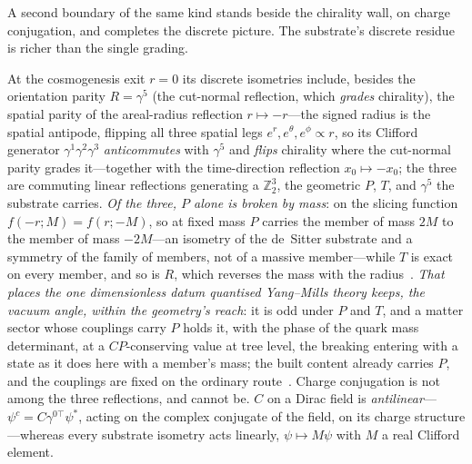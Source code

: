 \documentclass[11pt]{article}
\theoremstyle{plain}
\theoremstyle{remark}
\begin{document}
A second boundary of the same kind stands beside the chirality wall, on charge conjugation, and completes the discrete picture. The substrate's discrete residue is richer than the single grading. 

At the cosmogenesis exit $r=0$ its discrete isometries include, besides the orientation parity $R=\gamma^5$ (the cut-normal reflection, which \emph{grades} chirality), the spatial parity of the areal-radius reflection $r\mapsto-r$---the signed radius is the spatial antipode, flipping all three spatial legs $e^r,e^\theta,e^\phi\propto r$, so its Clifford generator $\gamma^1\gamma^2\gamma^3$ \emph{anticommutes} with $\gamma^5$ and \emph{flips} chirality where the cut-normal parity grades it---together with the time-direction reflection $x_0\mapsto-x_0$; the three are commuting linear reflections generating a $\mathbb{Z}_2^{3}$, the geometric $P$, $T$, and $\gamma^5$ the substrate carries. \emph{Of the three, $P$ alone is broken by mass}: on the slicing function $f(-r;M)=f(r;-M)$, so at fixed mass $P$ carries the member of mass $2M$ to the member of mass $-2M$---an isometry of the de~Sitter substrate and a symmetry of the family of members, not of a massive member---while $T$ is exact on every member, and so is $R$, which reverses the mass with the radius~\cite{JanzenMatter}. \emph{That places the one dimensionless datum quantised Yang--Mills theory keeps, the vacuum angle, within the geometry's reach}: it is odd under $P$ and $T$, and a matter sector whose couplings carry $P$ holds it, with the phase of the quark mass determinant, at a $CP$-conserving value at tree level, the breaking entering with a state as it does here with a member's mass; the built content already carries $P$, and the couplings are fixed on the ordinary route~\cite{JanzenMatter}. Charge conjugation is not among the three reflections, and cannot be. $C$ on a Dirac field is \emph{antilinear}---$\psi^c=C\gamma^{0\top}\psi^{*}$, acting on the complex conjugate of the field, on its charge structure---whereas every substrate isometry acts linearly, $\psi\mapsto M\psi$ with $M$ a real Clifford element. 
\end{document}
